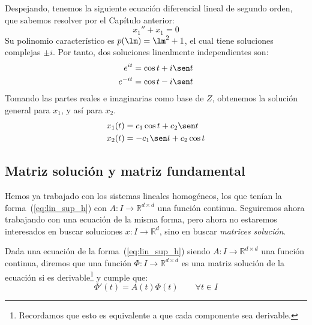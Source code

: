 \begin{ejemplo}
    Despejando, tenemos la siguiente ecuación diferencial lineal de segundo orden, que sabemos resolver por el Capítulo anterior:
    \begin{equation*}
        x_1'' + x_1 = 0
    \end{equation*}
    Su polinomio característico  es $p(\lm)=\lm^2 + 1$, el cual tiene soluciones complejas $\pm i$. Por tanto, dos soluciones linealmente independientes son:
    \begin{align*}
        e^{it}&=\cos t + i\sen t\\
        e^{-it}&=\cos t - i\sen t
    \end{align*}
    Tomando las partes reales e imaginarias como base de $Z$, obtenemos la solución general para $x_1$, y así para $x_2$.
    \begin{align*}
        x_1(t) &= c_1 \cos t + c_2\sen t\\
        x_2(t) &= -c_1\sen t + c_2\cos t
    \end{align*}
\end{ejemplo}

\subsection{Matriz solución y matriz fundamental}
\noindent
Hemos ya trabajado con los sistemas lineales homogéneos, los que tenían la forma~(\ref{eq:lin_sup_h}) con $A:I\rightarrow\mathbb{R}^{d\times d}$ una función continua. Seguiremos ahora trabajando con una ecuación de la misma forma, pero ahora no estaremos interesados en buscar soluciones $x:I\rightarrow\mathbb{R}^d$, sino en buscar \textit{matrices solución}.

\begin{definicion}
    Dada una ecuación de la forma~(\ref{eq:lin_sup_h}) siendo $A:I\rightarrow\mathbb{R}^{d\times d}$ una función continua, diremos que una función $\Phi:I\rightarrow\mathbb{R}^{d\times d}$ es una matriz solución de la ecuación si es derivable\footnote{Recordamos que esto es equivalente a que cada componente sea derivable.} y cumple que:
    \begin{equation*}
        \Phi'(t) = A(t)\Phi(t) \qquad \forall t\in I
    \end{equation*}
\end{definicion}

